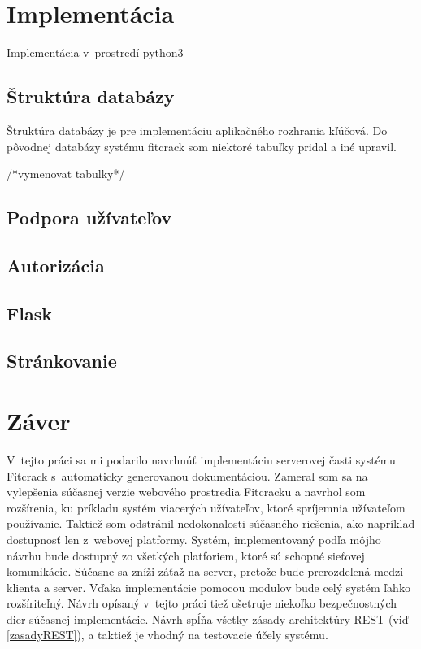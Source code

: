 \documentclass[slovak]{fitthesis}
\begin{document}
\chapter{Implementácia}\label{implementacia}
Implementácia v~prostredí python3


\section{Štruktúra databázy}
Štruktúra databázy je pre implementáciu aplikačného rozhrania kľúčová. Do pôvodnej databázy systému fitcrack som niektoré tabuľky pridal a iné upravil.

/*vymenovat tabulky*/


\section{Podpora užívateľov}

\section{Autorizácia}

\section{Flask}

\section{Stránkovanie}


\chapter{Záver}\label{zaver}
V~tejto práci sa mi podarilo navrhnúť implementáciu serverovej časti systému Fitcrack s~automaticky generovanou dokumentáciou. Zameral som sa na vylepšenia súčasnej verzie webového prostredia Fitcracku a navrhol som rozšírenia, ku príkladu systém viacerých užívateľov, ktoré spríjemnia užívateľom používanie. Taktiež som odstránil nedokonalosti súčasného riešenia, ako napríklad dostupnosť len z~webovej platformy. Systém, implementovaný podľa môjho návrhu bude dostupný zo všetkých platforiem, ktoré sú schopné sieťovej komunikácie. Súčasne sa zníži záťaž na server, pretože bude prerozdelená medzi klienta a server. Vďaka implementácie pomocou modulov bude celý systém ľahko rozšíriteľný. Návrh opísaný v~tejto práci tiež ošetruje niekoľko bezpečnostných dier súčasnej implementácie. Návrh spĺňa všetky zásady architektúry REST (viď \ref{zasadyREST}), a taktiež je vhodný na testovacie účely systému.
\end{document}
